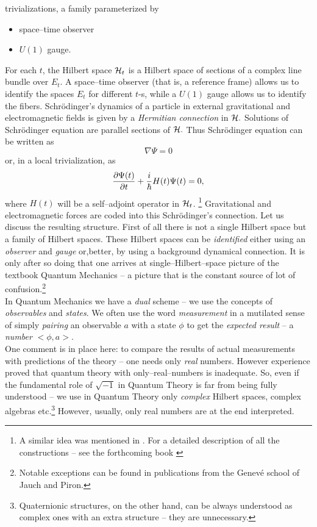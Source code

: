 \documentclass[12pt]{article}
\def\be{\begin{equation}} \def\ee{\end{equation}}
\begin{document}
trivializations,  a family parameterized by 
\begin{itemize}
\item  space--time observer 
\item $U (1)$ gauge.
\end{itemize}
For each $t$, the Hilbert space ${\cal H}_t$ is a Hilbert space
of sections of a complex line bundle over $E_t$. A space--time observer
(that is, a reference frame)
allows us to identify the spaces $E_t$ for different $t$-s, while
a $U(1)$ gauge allows us to identify the fibers.
Schr\"odinger's dynamics of a particle in external gravitational and
electromagnetic
fields
is given by a {\sl Hermitian connection} in ${\cal H}. $ Solutions of
Schr\"odinger
equation are parallel sections of ${\cal H}. $ Thus Schr\"odinger equation
can be written
as \be
\nabla \Psi = 0 \ee
or,  in a local trivialization,  as \be
{\frac{{\partial \Psi  (t)}}{{\partial t}}} + 
{i\over\hbar}H (t)\Psi  (t) =
0,  \ee
where $H (t)$ will be a self--adjoint operator in ${\cal H}_t$.%
\footnote{A similar idea was mentioned in \cite{aso}.  For a detailed
description of all the constructions -- see the forthcoming book \cite{jamo}}
Gravitational and electromagnetic forces are
coded into this Schr\"odinger's connection. 
Let us discuss the resulting structure.  First of all
there is not a single  Hilbert space but a
{family} of Hilbert spaces. 
These Hilbert spaces can be {\sl identified} either using an
{\sl observer}  and
{\sl gauge}  or,better, by using a background dynamical connection.
It is only after so doing 
that one arrives at
single--Hilbert--space picture of the textbook Quantum Mechanics --
a picture that
is the constant source of lot of confusion.\footnote{Notable
exceptions can be found in  publications from the
Genev\'e school of Jauch and Piron. }\\ 
In Quantum Mechanics we have a {\sl dual}
scheme -- we use the concepts of {\sl observables} and {\sl states}.  We often
use the word {\sl measurement} in a mutilated sense of simply {\sl pairing}
an observable $a$ with a state $\phi $ to get the {\sl expected result} -- 
a {\sl number} $
<\phi , a>. $ \\ One comment is in place here:  to compare the results of actual
measurements with predictions of the theory -- one needs only {\sl real}
numbers.  However experience proved that quantum theory with
only--real--numbers is inadequate.  So,  even if the fundamental role of
$\sqrt{-1}$ in Quantum Theory is far from being fully understood --
we use in Quantum Theory only {\sl complex} Hilbert spaces,  complex algebras
etc.\footnote{Quaternionic  structures,  on the other hand,  can be always 
understood as complex
ones with an extra structure -- they are unnecessary.  } 
However,  usually,  only real numbers are at the end interpreted.  
 
\end{document}
